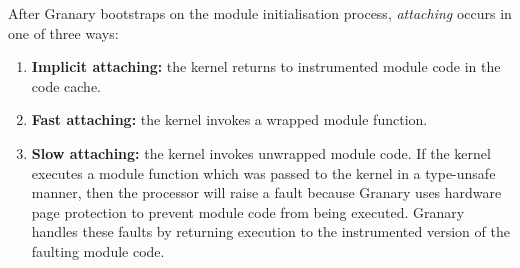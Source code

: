 \documentclass[preprint]{sigplanconf}
\newcommand{\comment}[1]{}
\begin{document}



After Granary bootstraps on the module initialisation process, \emph{attaching} occurs in one of three ways: \begin{enumerate}
	\item {\bf Implicit attaching:} the kernel returns to instrumented module code in the code cache.
	\item {\bf Fast attaching:} the kernel invokes a wrapped module function.
	\item {\bf Slow attaching:} the kernel invokes unwrapped module code. If the kernel executes a module function which was passed to the kernel in a type-unsafe manner, then the processor will raise a fault because Granary uses hardware page protection to prevent module code from being executed. Granary handles these faults by returning execution to the instrumented version of the faulting module code.
\end{enumerate}

\end{document}
